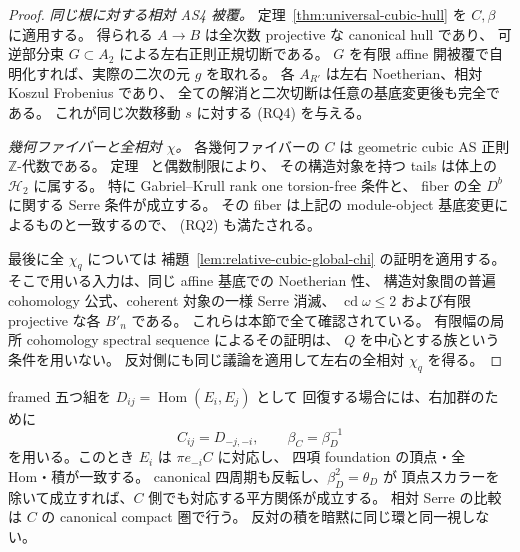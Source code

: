 \begin{proof}
\emph{同じ根に対する相対 AS4 被覆。}
定理~\ref{thm:universal-cubic-hull} を $C,\beta$ に適用する。
得られる $A\to B$ は全次数 projective な canonical hull であり、
可逆部分束 $G\subset A_2$ による左右正則正規切断である。
$G$ を有限 affine 開被覆で自明化すれば、実際の二次の元 $g$ を取れる。
各 $A_{R'}$ は左右 Noetherian、相対 Koszul Frobenius であり、
全ての解消と二次切断は任意の基底変更後も完全である。
これが同じ次数移動 $s$ に対する (RQ4) を与える。

\emph{幾何ファイバーと全相対 $\chi$。}
各幾何ファイバーの $C$ は geometric cubic AS 正則
$\mathbb Z$-代数である。
定理~\cite[\texttt{thm:all-admissible-inverse}]{QuadricIntrinsic2026} と偶数制限により、
その構造対象を持つ tails は体上の $\mathcal H_2$ に属する。
特に Gabriel--Krull rank one torsion-free 条件と、
fiber の全 $D^b$ に関する Serre 条件が成立する。
その fiber は上記の module-object 基底変更によるものと一致するので、
(RQ2) も満たされる。

最後に全 $\chi_q$ については
補題~\ref{lem:relative-cubic-global-chi} の証明を適用する。
そこで用いる入力は、同じ affine 基底での Noetherian 性、
構造対象間の普遍 cohomology 公式、coherent 対象の一様 Serre 消滅、
$\operatorname{cd}\omega\le2$ および有限 projective な各 $B'_n$ である。
これらは本節で全て確認されている。
有限幅の局所 cohomology spectral sequence によるその証明は、
$Q$ を中心とする族という条件を用いない。
反対側にも同じ議論を適用して左右の全相対 $\chi_q$ を得る。
\end{proof}

\begin{remark}
\label{rem:general-cubic-right-orientation}
framed 五つ組を $D_{ij}=\operatorname{Hom}(E_i,E_j)$ として
回復する場合には、右加群のために
\[
 C_{ij}=D_{-j,-i},\qquad \beta_C=\beta_D^{-1}
\]
を用いる。このとき $E_i$ は $\pi e_{-i}C$ に対応し、
四項 foundation の頂点・全 Hom・積が一致する。
canonical 四周期も反転し、$\beta_D^2=\theta_D$ が
頂点スカラーを除いて成立すれば、$C$ 側でも対応する平方関係が成立する。
相対 Serre の比較は $C$ の canonical compact 圏で行う。
反対の積を暗黙に同じ環と同一視しない。
\end{remark}
